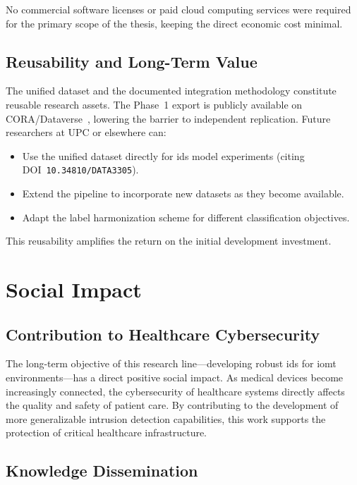 No commercial software licenses or paid cloud computing services were required for the primary scope of the thesis, keeping the direct economic cost minimal.

\subsection{Reusability and Long-Term Value}

The unified dataset and the documented integration methodology constitute reusable research assets. The Phase~1 export is publicly available on CORA/Dataverse~\cite{unified_iomt_csuc2026}, lowering the barrier to independent replication. Future researchers at UPC or elsewhere can:

\begin{itemize}
    \item Use the unified dataset directly for \gls{ids} model experiments (citing DOI~\texttt{10.34810/DATA3305}).
    \item Extend the pipeline to incorporate new datasets as they become available.
    \item Adapt the label harmonization scheme for different classification objectives.
\end{itemize}

This reusability amplifies the return on the initial development investment.

\section{Social Impact}
\label{sec:social}

\subsection{Contribution to Healthcare Cybersecurity}

The long-term objective of this research line---developing robust \gls{ids} for \gls{iomt} environments---has a direct positive social impact. As medical devices become increasingly connected, the cybersecurity of healthcare systems directly affects the quality and safety of patient care. By contributing to the development of more generalizable intrusion detection capabilities, this work supports the protection of critical healthcare infrastructure.

\subsection{Knowledge Dissemination}

